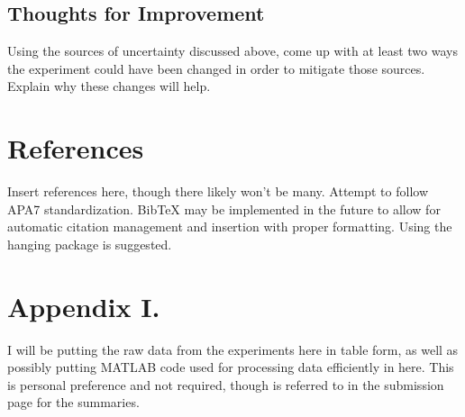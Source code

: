 \documentclass[11pt, letterpaper, notitlepage]{article}
\begin{document}
\begin{multicols}{2}
    \subsection*{Thoughts for Improvement}
    Using the sources of uncertainty discussed above, come up with at least two ways 
    the experiment could have been changed in order to mitigate those sources. Explain 
    why these changes will help.    

    \section*{References}
    Insert references here, though there likely won't be many. Attempt to follow APA7 
    standardization. BibTeX may be implemented in the future to allow for automatic 
    citation management and insertion with proper formatting. Using the hanging 
    package is suggested.

    \section*{Appendix I.}
    I will be putting the raw data from the experiments here in table form, as well as 
    possibly putting MATLAB code used for processing data efficiently in here. This is 
    personal preference and not required, though is referred to in the submission page 
    for the summaries.
\end{multicols}
\end{document}
